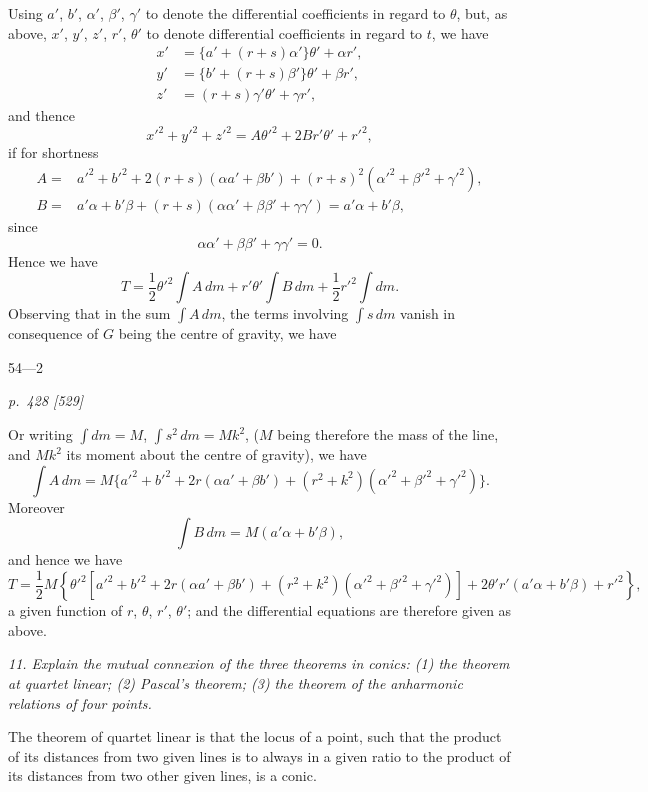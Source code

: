 \documentclass[11pt,a4paper]{article}
\theoremstyle{plain}
\theoremstyle{definition}
\begin{document}
\noindent
Using $a'$, $b'$, $\alpha'$, $\beta'$, $\gamma'$ to denote the differential coefficients in regard to
$\theta$, but, as above, $x'$, $y'$, $z'$, $r'$, $\theta'$ to denote differential coefficients in regard
to $t$, we have
\[
\begin{aligned}
x'&=\{a'+(r+s)\alpha'\}\theta'+\alpha r',\\
y'&=\{b'+(r+s)\beta'\}\theta'+\beta r',\\
z'&=(r+s)\gamma'\theta'+\gamma r',
\end{aligned}
\]
and thence
\[
x'^2+y'^2+z'^2=A\theta'^2+2Br'\theta'+r'^2,
\]
if for shortness
\[
\begin{aligned}
A={}&a'^2+b'^2+2(r+s)(\alpha a'+\beta b')+(r+s)^2(\alpha'^2+\beta'^2+\gamma'^2),\\
B={}&a'\alpha+b'\beta+(r+s)(\alpha\alpha'+\beta\beta'+\gamma\gamma')
     =a'\alpha+b'\beta,
\end{aligned}
\]
since
\[
\alpha\alpha'+\beta\beta'+\gamma\gamma'=0.
\]
Hence we have
\[
T=\frac12\theta'^2\int A\,dm+r'\theta'\int B\,dm+\frac12r'^2\int dm.
\]
Observing that in the sum $\int A\,dm$, the terms involving $\int s\,dm$ vanish in consequence
of $G$ being the centre of gravity, we have

\bigskip
\hfill{\small 54---2}

\clearpage

\bigskip
\textit{p.~428 [529]}
\smallskip

Or writing $\int dm=M$, $\int s^2\,dm=Mk^2$, ($M$ being therefore the mass of the line,
and $Mk^2$ its moment about the centre of gravity), we have
\[
\int A\,dm
=M\{a'^2+b'^2+2r(\alpha a'+\beta b')+(r^2+k^2)(\alpha'^2+\beta'^2+\gamma'^2)\}.
\]
Moreover
\[
\int B\,dm=M(a'\alpha+b'\beta),
\]
and hence we have
\[
T=\frac12M\left\{
\theta'^2\!\left[a'^2+b'^2+2r(\alpha a'+\beta b')+(r^2+k^2)(\alpha'^2+\beta'^2+\gamma'^2)\right]
+2\theta'r'(a'\alpha+b'\beta)+r'^2
\right\},
\]
a given function of $r$, $\theta$, $r'$, $\theta'$; and the differential equations are therefore given as above.

\textit{11. Explain the mutual connexion of the three theorems in conics: (1) the theorem at quartet linear; (2) Pascal's theorem; (3) the theorem of the anharmonic relations of four points.}

The theorem of quartet linear is that the locus of a point, such that the product
of its distances from two given lines is to always in a given ratio to the product of
its distances from two other given lines, is a conic.
\end{document}
